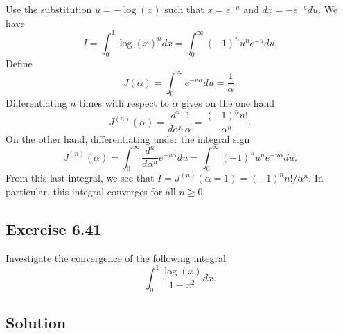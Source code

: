 Use the substitution $u = -\log(x)$ such that $x = e^{-u}$ and $dx = -e^{-u}du$.
We have
\begin{equation*}
    I = \int_0^1 \log(x)^n dx
        = \int_0^{\infty} (-1)^n u^n e^{-u} du.
\end{equation*}
Define
\begin{equation*}
    J(\alpha) = \int_0^{\infty} e^{-u\alpha} du = \frac{1}{\alpha}.
\end{equation*}
Differentiating $n$ times with respect to $\alpha$ gives on the one hand
\begin{equation*}
    J^{(n)}(\alpha) = \frac{d^n}{d\alpha^n} \frac{1}{\alpha} = \frac{(-1)^n n!}{\alpha^n}.
\end{equation*}
On the other hand, differentiating under the integral sign
\begin{equation*}
    J^{(n)}(\alpha) = \int_0^{\infty} \frac{d^n}{d\alpha^n} e^{-u\alpha} du
        = \int_0^{\infty} (-1)^n u^n e^{-u\alpha} du.
\end{equation*}
From this last integral, we see that $I = J^{(n)}(\alpha = 1) = (-1)^n n! / \alpha^n$.
In particular, this integral converges for all $n \geq 0$.


\subsection*{Exercise 6.41}

Investigate the convergence of the following integral
\begin{equation*}
    \int_0^1 \frac{\log(x)}{1 - x^2} dx.
\end{equation*}

\subsection*{Solution}

